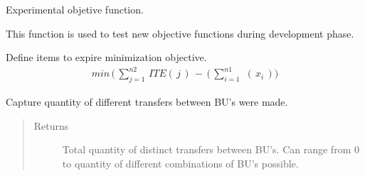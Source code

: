\documentclass[letterpaper,10pt,english]{sphinxmanual}
\begin{document}
\begin{fulllineitems}

\begin{fulllineitems}
\label{\detokenize{source/optimization.model:optimization.model.optimizer.ObjectiveFunction._experimental_objective}}
Experimental objetive function.

This function is used to test new objective functions during development phase.

\end{fulllineitems}


\begin{fulllineitems}
\label{\detokenize{source/optimization.model:optimization.model.optimizer.ObjectiveFunction._expire_objective}}
Define items to expire minimization objective.
\begin{equation*}
\begin{split}min\, \bigg ( \,\sum_{j=1}^{n2}\,ITE(\,j\,)\,-\,(\,\sum_{i=1}^{n1}\,\,  (\,x_i\,) \bigg  )\end{split}
\end{equation*}
\end{fulllineitems}


\begin{fulllineitems}
\label{\detokenize{source/optimization.model:optimization.model.optimizer.ObjectiveFunction._get_total_transfers}}
Capture quantity of different transfers between BU’s were made.
\begin{quote}\begin{description}
\item[{Returns}] \leavevmode
Total quantity of distinct transfers between BU’s. Can range from 0
to quantity of different combinations of BU’s possible.


\end{description}
\end{quote}
\end{fulllineitems}
\end{fulllineitems}
\end{document}
